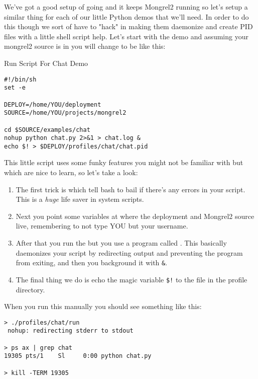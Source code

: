 We've got a good setup of  going and it keeps Mongrel2 
running so let's setup a similar thing for each of our little
Python demos that we'll need.  In order to do this though we sort
of have to "hack" in making them daemonize and create PID files with
a little shell script help.  Let's start with the  demo
and assuming your mongrel2 source is in  
you will change  to be like this:

\begin{code}{Run Script For Chat Demo}
\begin{Verbatim}
#!/bin/sh
set -e

DEPLOY=/home/YOU/deployment
SOURCE=/home/YOU/projects/mongrel2

cd $SOURCE/examples/chat
nohup python chat.py 2>&1 > chat.log &
echo $! > $DEPLOY/profiles/chat/chat.pid
\end{Verbatim}
\end{code}

This little script uses some funky features you might not be familiar
with but which are nice to learn, so let's take a look:



\begin{enumerate}
\item The first trick is  which tell bash to bail if there's 
    any errors in your script.  This is a \emph{huge} life saver in system
    scripts.
\item Next you point some variables at where the deployment and Mongrel2 source
    live, remembering to not type YOU but your username.
\item After that you run the  but you use a program called .  
    This basically daemonizes your script by redirecting output and 
    preventing the program from exiting, and then you background it with \verb|&|.
\item The final thing we do is echo the magic variable \verb|$!| to the 
     file in the profile directory.
\end{enumerate}

When you run this manually you should see something like this:

\begin{Verbatim}
> ./profiles/chat/run 
 nohup: redirecting stderr to stdout

> ps ax | grep chat
19305 pts/1    Sl     0:00 python chat.py

> kill -TERM 19305
\end{Verbatim}

